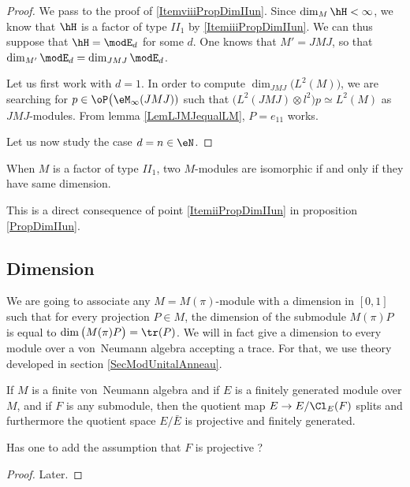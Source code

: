 \begin{proof}
	We pass to the proof of \ref{ItemviiiPropDimIIun}. Since $\dim_M\hH<\infty$, we know that $\hH$ is a factor of type $II_1$ by \ref{ItemiiiPropDimIIun}. We can thus suppose that $\hH=\modE_d$ for some $d$. One knows that $M'=JMJ$, so that $\dim_{M'}\modE_d=\dim_{JMJ}\modE_d$. 
	
	Let us first work with $d=1$. In order to compute $\dim_{JMJ}\big( L^2(M) \big)$, we are searching for $p\in\oP\big(\eM_{\infty}(JMJ))$ such that $\big( L^2(JMJ)\otimes l^2 \big)p\simeq L^2(M)$ as $JMJ$-modules. From lemma \ref{LemLJMJequalLM}, $P=e_{11}$ works.
	
	Let us now study the case $d=n\in\eN$.
	
\end{proof}

\begin{corollary}
	When $M$ is a factor of type $II_1$, two $M$-modules are isomorphic if and only if they have same dimension.
\end{corollary}
This is a direct consequence of point \ref{ItemiiPropDimIIun} in proposition \ref{PropDimIIun}.


					\subsection{Dimension}

We are going to associate any $M=M(\pi)$-module with a dimension in $[0,1]$ such that for every projection $P\in M$, the dimension of the submodule $M(\pi)P$ is equal to $\dim\big( M(\pi)P \big)=\tr(P)$. We will in fact give a dimension to every module over a von~Neumann algebra accepting a trace. For that, we use theory developed in section \ref{SecModUnitalAnneau}.

\begin{theorem}			\label{ThofgsurMFSubEEClSplits}
If $M$ is a finite von~Neumann algebra and if $E$ is a finitely generated module over $M$, and if $F$ is any submodule, then the quotient map $E\to E/\Cl_E(F)$ splits and furthermore the quotient space $E/\bar E$ is projective and finitely generated.
\end{theorem}

\begin{probleme}
Has one to add the assumption that $F$ is projective ?
\end{probleme}
\begin{proof}
Later.
\end{proof}

